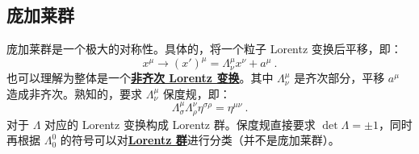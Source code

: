 
\subsection{庞加莱群}
庞加莱群是一个极大的对称性。具体的，将一个粒子 Lorentz 变换后平移，即：
\begin{equation}
	x^\mu \rightarrow (x')^\mu = \Lambda_{\nu}^\mu x^\nu + a^\mu ~.
\end{equation}
也可以理解为整体是一个\underline{\textbf{非齐次 Lorentz 变换}}。其中 $\Lambda_{\nu}^\mu$ 是齐次部分，平移 $a^\mu$ 造成非齐次。熟知的，要求 $\Lambda_{\nu}^\mu$ 保度规，即：
\begin{equation}
	\Lambda_{\sigma}^\mu \Lambda_{\rho}^\nu \eta^{\sigma \rho} = \eta^{\mu \nu} ~.
\end{equation}
对于 $\Lambda$ 对应的 Lorentz 变换构成 Lorentz 群。保度规直接要求 $\det \Lambda = \pm 1$，同时再根据 $\Lambda^0_0$ 的符号可以对\underline{\textbf{Lorentz 群}}进行分类（并不是庞加莱群）。
